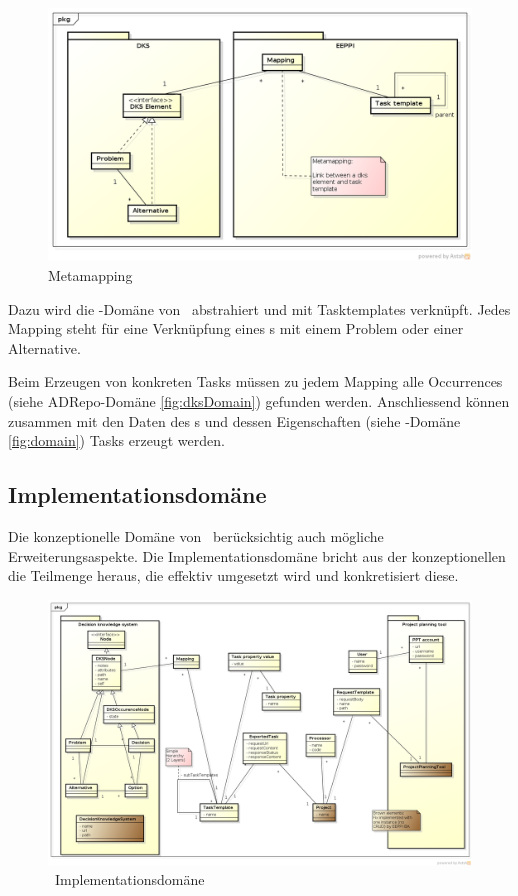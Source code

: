 			\begin{figure}[H]
				\includegraphics[width=\linewidth]{architecture/media/img/metaMapping.png}
				\centering
				\caption{Metamapping}
				\label{fig:metamapping}
			\end{figure}		
			
			Dazu wird die \dks -Domäne von \eeppi\ abstrahiert und mit Task\-tem\-plates verknüpft.
			Jedes Mapping steht für eine Verknüpfung eines \ttpl s mit einem Problem oder einer Alternative.
			
			Beim Erzeugen von konkreten Tasks müssen zu jedem Mapping alle Occurrences (siehe ADRepo-Domäne \ref{fig:dksDomain}) gefunden werden. %
			Anschliessend können zusammen mit den Daten des \ttpl s und dessen Eigenschaften (siehe \eeppi-Domäne \ref{fig:domain}) Tasks erzeugt werden.
			
			
		\subsection{Implementationsdomäne}
			Die konzeptionelle Domäne von \eeppi\ berücksichtig auch mögliche Erweiterungsaspekte.
			Die Implementationsdomäne bricht aus der konzeptionellen die Teilmenge heraus, die effektiv umgesetzt wird und konkretisiert diese.
			
			\begin{landscape}
				\begin{figure}[H]
					\includegraphics[width=0.9\linewidth]{architecture/media/img/implementationDomain.png}
					\centering
					\caption{\eeppi\ Implementationsdomäne}
					\label{fig:implementationDomain}
				\end{figure}				
			\end{landscape}	
			

